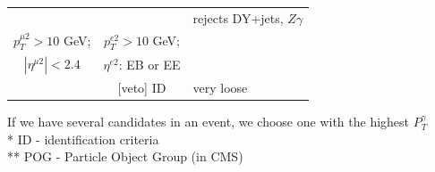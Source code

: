 \begin{frame}
\begin{table}[h]
\begin{center}
\begin{tabular}{|c|c|l|}
      \multicolumn{2}{|c|}{\scriptsize\bfseries\color{blue}{Second lepton veto:}} & rejects DY+jets, $Z\gamma$\\
      \tiny{$p_T^{\mu2}>10$ GeV;} &  \tiny{$p_T^{e2}>10$ GeV;} & \\
      \tiny{$|\eta^{\mu2}|<2.4$}  &   \tiny{ $\eta^{e2}$: EB or EE} &  \\
                                &   \tiny{[veto] ID} & very loose \\ \hline
      \end{tabular}
      \end{center}
  \end{table}
\scriptsize
If we have several candidates in an event, we choose one with the highest $P_T^{\gamma}$\\
\tiny
* ID - identification criteria\\
** POG - Particle Object Group (in CMS)\\
\end{frame}%


